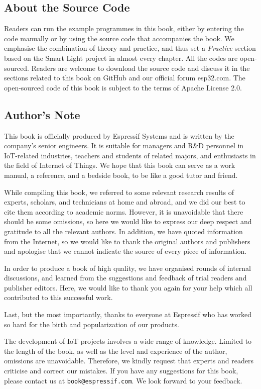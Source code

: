\documentclass[a4paper,12pt,openany]{book}
\begin{document}
\subsection*{About the Source Code}
Readers can run the example programmes in this book, either by entering the code manually or by using the source code that accompanies the book. We emphasise the combination of theory and practice, and thus set a \textit{Practice} section based on the Smart Light project in almost every chapter. All the codes are open-sourced. Readers are welcome to download the source code and discuss it in the sections related to this book on GitHub and our official forum esp32.com. The open-sourced code of this book is subject to the terms of Apache License 2.0.

\subsection*{Author’s Note}
This book is officially produced by Espressif Systems and is written by the company’s senior engineers. It is suitable for managers and R\&D personnel in IoT-related industries, teachers and students of related majors, and enthusiasts in the field of Internet of Things. We hope that this book can serve as a work manual, a reference, and a bedside book, to be like a good tutor and friend.

While compiling this book, we referred to some relevant research results of experts, scholars, and technicians at home and abroad, and we did our best to cite them according to academic norms. However, it is unavoidable that there should be some omissions, so here we would like to express our deep respect and gratitude to all the relevant authors. In addition, we have quoted information from the Internet, so we would like to thank the original authors and publishers and apologise that we cannot indicate the source of every piece of information.

In order to produce a book of high quality, we have organised rounds of internal discussions, and learned from the suggestions and feedback of trial readers and publisher editors. Here, we would like to thank you again for your help which all contributed to this successful work.

Last, but the most importantly, thanks to everyone at Espressif who has worked so hard for the birth and popularization of our products.

The development of IoT projects involves a wide range of knowledge. Limited to the length of the book, as well as the level and experience of the author, omissions are unavoidable. Therefore, we kindly request that experts and readers criticise and correct our mistakes. If you have any suggestions for this book, please contact us at \texttt{book@espressif.com}. We look forward to your feedback.
\end{document}
